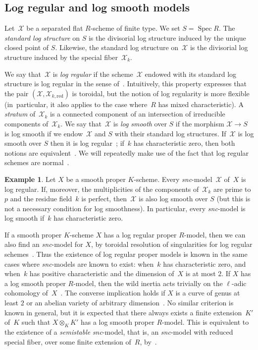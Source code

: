 \documentclass[11pt]{article}
\theoremstyle{definition}
\newtheorem{example}[equation]{Example}
\numberwithin{equation}{subsection}
\newcommand{\cX}{\ensuremath{\mathscr{X}}}
\newcommand{\snc}{\textit{snc}}
\newcommand{\red}{\mathrm{red}}
\DeclareMathOperator{\Spec}{Spec}
\begin{document}
\subsection{Log regular and log smooth models}
Let~$\cX$ be a separated flat $R$\nobreakdash-scheme of finite type. We set $S=\Spec R$. The {\em standard log structure} on $S$ is the divisorial log structure induced by the unique closed point of $S$. Likewise, the standard log structure on~$\cX$ is the divisorial log structure induced by the special fiber~$\cX_k$.

We say that~$\cX$ is {\em log regular} if the scheme~$\cX$ endowed with its standard log structure
is log regular in the sense of~\cite{kato}. Intuitively, this property expresses that the pair $(\cX,\cX_{k,\red})$ is toroidal, but the notion of log regularity is more flexible (in~particular, it also applies to the case where~$R$ has mixed characteristic). A {\em stratum} of~$\cX_k$ is a connected component of an intersection of irreducible components of~$\cX_k$.
We say that~$\cX$ is {\em log smooth} over $S$ if the morphism $\cX\to S$ is log smooth if we endow~$\cX$ and
$S$ with their standard log structures.
If~$\cX$ is log smooth over $S$ then it is log regular~\cite[8.2]{kato}; if~$k$ has characteristic zero, then both notions are equivalent~\cite[3.6.1]{logzeta}.
We will repeatedly make use of the fact that log regular schemes are normal~\cite[4.1]{kato}.

\begin{example}
Let $X$ be a smooth proper $K$\nobreakdash-scheme. Every \snc-model~$\cX$ of~$X$ is log regular. If, moreover, the multiplicities of the components of~$\cX_k$ are prime to $p$ and the residue field~$k$ is perfect, then~$\cX$ is also log smooth over $S$ (but this is not a necessary condition for log smoothness). In particular, every \snc-model is log smooth if~$k$ has characteristic zero.
\end{example}

If a smooth proper $K$\nobreakdash-scheme $X$ has a log regular proper $R$\nobreakdash-model, then we can also find an \snc-model for $X$, by toroidal resolution of singularities for log regular schemes~\cite{kato}.
Thus the existence of log regular proper models is known in the same cases where \snc-models are known to exist: when~$k$ has characteristic zero, and when~$k$ has positive characteristic and the dimension of~$X$ is at most $2$.
If $X$ has a log smooth proper $R$\nobreakdash-model, then the wild inertia acts trivially on the $\ell$-adic cohomology of~$X$~\cite[0.1.1]{nakayama-nearby}.
The converse implication holds if $X$ is a curve of genus at least $2$ or an abelian variety of arbitrary dimension~\cite{saito-sstable, stix, bellardini-smeets}. No similar criterion is known in general, but it is expected that there always exists a finite extension~$K'$ of~$K$ such that $X\otimes_K K'$ has a log smooth proper $R$\nobreakdash-model. This is equivalent to the existence of a {\em semistable} \snc-model, that is, an \snc-model with reduced special fiber, over some finite extension of~$R$, by~\cite{saito-sstable}.
\end{document}
